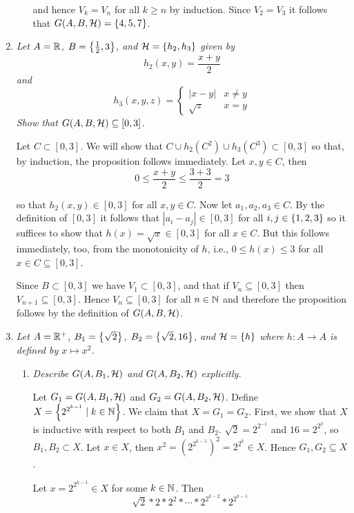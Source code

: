 \documentclass[10pt]{article}
\begin{document}
\begin{enumerate}
\begin{enumerate}
and hence $V_k = V_n$ for all $k \geq n$ by induction.  Since $V_2 = V_3$ it follows that $G(A,B,\cal{H}) = \set{4,5,7}$.
\end{enumerate}

\item \emph{Let $A = \R$, $B = \set{\frac{1}{2}, 3}$, and $\cal{H} = \set{h_2, h_3}$ given by $$h_2(x,y) = \frac{x+y}{2}$$ and $$h_3(x,y,z) = \begin{cases} |x-y| & x \neq y \\ \sqrt{z} & x=y \end{cases}$$  Show that $G(A,B,\cal{H}) \subseteq [0,3]$.}

Let $C \subset [0,3]$.  We will show that $C \cup h_2(C^2) \cup h_3 (C^3) \subset [0,3]$ so that, by induction, the proposition follows immediately.  Let $x,y \in C$, then
\[
0 \leq \frac{x+y}{2} \leq \frac{3+3}{2} = 3
\]

so that $h_2(x,y) \in [0,3]$ for all $x,y \in C$.  Now let $a_1,a_2,a_3 \in C$.  By the definition of $[0,3]$ it follows that $|a_i - a_j| \in [0,3]$ for all $i,j \in \set{1,2,3}$ so it suffices to show that $h(x) = \sqrt{x} \in [0,3]$ for all $x \in C$.  But this follows immediately, too, from the monotonicity of $h$, i.e., $0 \leq h(x) \leq 3$ for all $x \in C \subseteq [0,3]$.

Since $B \subset [0,3]$ we have $V_1 \subset [0,3]$, and that if $V_n \subseteq [0,3]$ then $V_{n+1} \subseteq [0,3]$.  Hence $V_n \subseteq [0,3]$ for all $n \in \N$ and therefore the proposition follows by the definition of $G(A,B,\cal{H})$.

\item \emph{Let $A = \R^+$, $B_1=\set{\sqrt{2}}$, $B_2 = \set{\sqrt{2}, 16}$, and $\cal{H} = \set{h}$ where $h: A \to A$ is defined by $x \mapsto x^2$.}
\begin{enumerate}
\item \emph{Describe $G(A, B_1, \cal{H})$ and $G(A, B_2, \cal{H})$ explicitly.}

Let $G_1 = G(A, B_1, \cal{H})$ and $G_2 = G(A, B_2, \cal{H})$.  Define $X = \set{2^{2^{k-1}} \mid k \in \N}$.  We claim that $X = G_1 = G_2$.  First, we show that $X$ is inductive with respect to both $B_1$ and $B_2$.  $\sqrt{2} = 2^{2^{-1}}$ and $16 = 2^{2^2}$, so $B_1, B_2 \subset X$.  Let $x \in X$, then $x^2 = \left(2^{2^{k-1}}\right)^2 = 2^{2^k} \in X$.  Hence $G_1, G_2 \subseteq X$.

Let $x = 2^{2^{k-1}} \in X$ for some $k \in \N$.  Then
\[
\sqrt{2} \ast 2 \ast 2^2 \ast \cdots \ast 2^{2^{k-2}} \ast 2^{2^{k-1}}
\]


\end{enumerate}
\end{enumerate}
\end{document}
